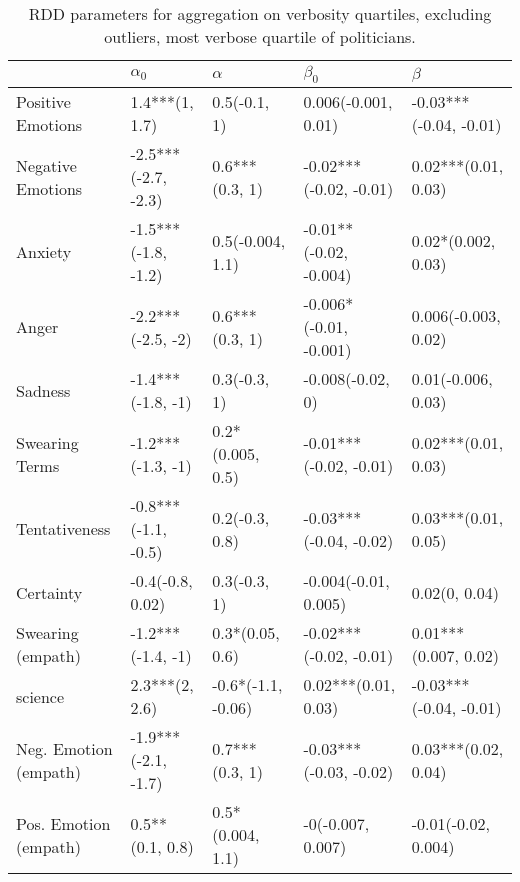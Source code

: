 \begin{table}[h]\centering
\begin{adjustbox}{width=\linewidth, center}
	\begin{tabular}{lllll}
	\toprule
	{} &           $\alpha_0$ &            $\alpha$ &               $\beta_0$ &                 $\beta$ \\
	\midrule
	Positive Emotions     &       1.4***(1, 1.7) &        0.5(-0.1, 1) &     0.006(-0.001, 0.01) &  -0.03***(-0.04, -0.01) \\
	Negative Emotions     &  -2.5***(-2.7, -2.3) &      0.6***(0.3, 1) &  -0.02***(-0.02, -0.01) &     0.02***(0.01, 0.03) \\
	Anxiety               &  -1.5***(-1.8, -1.2) &    0.5(-0.004, 1.1) &  -0.01**(-0.02, -0.004) &      0.02*(0.002, 0.03) \\
	Anger                 &    -2.2***(-2.5, -2) &      0.6***(0.3, 1) &  -0.006*(-0.01, -0.001) &     0.006(-0.003, 0.02) \\
	Sadness               &    -1.4***(-1.8, -1) &        0.3(-0.3, 1) &        -0.008(-0.02, 0) &      0.01(-0.006, 0.03) \\
	Swearing Terms        &    -1.2***(-1.3, -1) &    0.2*(0.005, 0.5) &  -0.01***(-0.02, -0.01) &     0.02***(0.01, 0.03) \\
	Tentativeness         &  -0.8***(-1.1, -0.5) &      0.2(-0.3, 0.8) &  -0.03***(-0.04, -0.02) &     0.03***(0.01, 0.05) \\
	Certainty             &     -0.4(-0.8, 0.02) &        0.3(-0.3, 1) &    -0.004(-0.01, 0.005) &           0.02(0, 0.04) \\
	Swearing (empath)     &    -1.2***(-1.4, -1) &     0.3*(0.05, 0.6) &  -0.02***(-0.02, -0.01) &    0.01***(0.007, 0.02) \\
	science               &       2.3***(2, 2.6) &  -0.6*(-1.1, -0.06) &     0.02***(0.01, 0.03) &  -0.03***(-0.04, -0.01) \\
	Neg. Emotion (empath) &  -1.9***(-2.1, -1.7) &      0.7***(0.3, 1) &  -0.03***(-0.03, -0.02) &     0.03***(0.02, 0.04) \\
	Pos. Emotion (empath) &      0.5**(0.1, 0.8) &    0.5*(0.004, 1.1) &       -0(-0.007, 0.007) &     -0.01(-0.02, 0.004) \\
	\bottomrule
	\end{tabular}
	
\end{adjustbox}
	\caption{RDD parameters for aggregation on verbosity quartiles, excluding outliers, most verbose quartile of politicians.}
	\label{fig: Verbosity_2}
\end{table}

